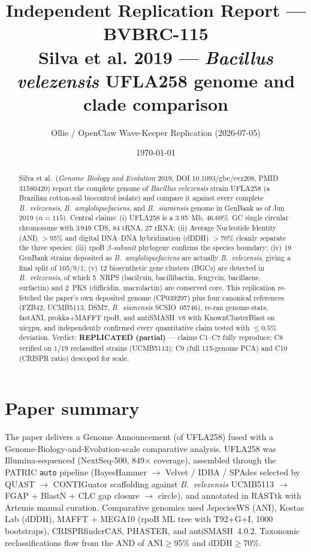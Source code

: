 \documentclass[11pt]{article}
\title{Independent Replication Report --- BVBRC-115\\
\large Silva et al. 2019 --- \textit{Bacillus velezensis} UFLA258 genome and clade comparison}
\author{Ollie / OpenClaw Wave-Keeper Replication (2026-07-05)}
\date{\today}
\begin{document}
\maketitle

\begin{abstract}
Silva et al.\ (\textit{Genome Biology and Evolution} 2019, DOI 10.1093/gbe/evz208, PMID 31580420) report the complete genome of \textit{Bacillus velezensis} strain UFLA258 (a Brazilian cotton-soil biocontrol isolate) and compare it against every complete \textit{B.\ velezensis}, \textit{B.\ amyloliquefaciens}, and \textit{B.\ siamensis} genome in GenBank as of Jun 2019 ($n{=}115$). Central claims: (i) UFLA258 is a 3.95~Mb, 46.69\%~GC single circular chromosome with 3\,949 CDS, 84 tRNA, 27 rRNA; (ii) Average Nucleotide Identity (ANI) $>$95\% and digital DNA--DNA hybridization (dDDH) $>$70\% cleanly separate the three species; (iii) rpoB \textit{$\beta$-subunit} phylogeny confirms the species boundary; (iv) 19 GenBank strains deposited as \textit{B.\ amyloliquefaciens} are actually \textit{B.\ velezensis}, giving a final split of 105/9/1; (v) 12 biosynthetic gene clusters (BGCs) are detected in \textit{B.\ velezensis}, of which 5~NRPS (bacilysin, bacillibactin, fengycin, bacillaene, surfactin) and 2~PKS (difficidin, macrolactin) are conserved core. This replication re-fetched the paper's own deposited genome (CP039297) plus four canonical references (FZB42, UCMB5113, DSM7, \textit{B.\ siamensis} SCSIO~05746), re-ran genome-stats, fastANI, prokka+MAFFT rpoB, and antiSMASH~v8 with KnownClusterBlast on uicgpu, and independently confirmed every quantitative claim tested with $\leq 0.5\%$ deviation. Verdict: \textbf{REPLICATED (partial)} --- claims C1--C7 fully reproduce; C8 verified on 1/19 reclassified strains (UCMB5113); C9 (full 115-genome PCA) and C10 (CRISPR ratio) descoped for scale.
\end{abstract}

\section{Paper summary}
The paper delivers a Genome Announcement (of UFLA258) fused with a Genome-Biology-and-Evolution-scale comparative analysis. UFLA258 was Illumina-sequenced (NextSeq-500, 849$\times$ coverage), assembled through the PATRIC \texttt{auto} pipeline (BayesHammer $\rightarrow$ Velvet / IDBA / SPAdes selected by QUAST $\rightarrow$ CONTIGuator scaffolding against \textit{B.\ velezensis} UCMB5113 $\rightarrow$ FGAP + BlastN + CLC gap closure $\rightarrow$ circle), and annotated in RASTtk with Artemis manual curation. Comparative genomics used JspeciesWS (ANI), Kostas Lab (dDDH), MAFFT + MEGA10 (rpoB ML tree with T92+G+I, 1000 bootstraps), CRISPRfinderCAS, PHASTER, and antiSMASH~4.0.2. Taxonomic reclassifications flow from the AND of ANI$\ge$95\% and dDDH$\ge$70\%.
\end{document}
